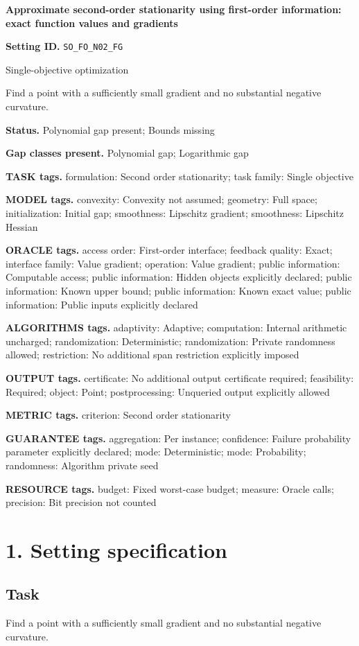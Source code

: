 \documentclass[10pt,a4paper]{article}
\begin{document}
\raggedright

{\LARGE\bfseries\sffamily\color{AtlasNavy} Approximate second-order stationarity using first-order information: exact function values and gradients\par}\vspace{5pt}
\textbf{Setting ID.} \texttt{SO\_\allowbreak{}FO\_\allowbreak{}N02\_\allowbreak{}FG}

Single-objective optimization

Find a point with a sufficiently small gradient and no substantial negative curvature.

\textbf{Status.} Polynomial gap present; Bounds missing

\textbf{Gap classes present.} Polynomial gap; Logarithmic gap

\textbf{TASK tags.} formulation: Second order stationarity; task family: Single objective

\textbf{MODEL tags.} convexity: Convexity not assumed; geometry: Full space; initialization: Initial gap; smoothness: Lipschitz gradient; smoothness: Lipschitz Hessian

\textbf{ORACLE tags.} access order: First-order interface; feedback quality: Exact; interface family: Value gradient; operation: Value gradient; public information: Computable access; public information: Hidden objects explicitly declared; public information: Known upper bound; public information: Known exact value; public information: Public inputs explicitly declared

\textbf{ALGORITHMS tags.} adaptivity: Adaptive; computation: Internal arithmetic uncharged; randomization: Deterministic; randomization: Private randomness allowed; restriction: No additional span restriction explicitly imposed

\textbf{OUTPUT tags.} certificate: No additional output certificate required; feasibility: Required; object: Point; postprocessing: Unqueried output explicitly allowed

\textbf{METRIC tags.} criterion: Second order stationarity

\textbf{GUARANTEE tags.} aggregation: Per instance; confidence: Failure probability parameter explicitly declared; mode: Deterministic; mode: Probability; randomness: Algorithm private seed

\textbf{RESOURCE tags.} budget: Fixed worst-case budget; measure: Oracle calls; precision: Bit precision not counted

\section{1. Setting specification}
\subsection{Task}
Find a point with a sufficiently small gradient and no substantial negative curvature.
\end{document}
